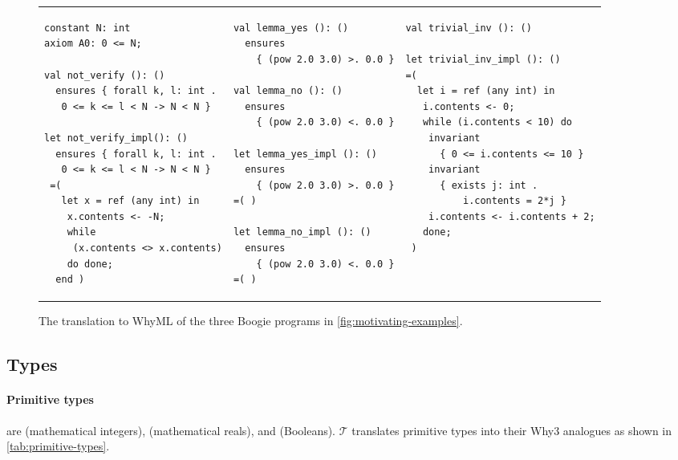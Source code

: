 \documentclass[a4paper,final]{llncs}
\makeatletter
\newif\iflong
\newcommand{\tr}{\mathcal{T}}
\newcommand{\Boogie}{Boogie\xspace}
\newcommand{\WhyML}{WhyML\xspace}
\newcommand{\Why}{Why3\xspace}
\newcommand{\tightParagraph}[1]{\paragraph{#1}}
\newcommand\tightParagraph{\@startsection{paragraph}{4}{\z@}{-5\p@ \@plus -4\p@ \@minus -4\p@}{-0.5em \@plus -0.22em \@minus -0.1em}{\normalfont\normalsize\itshape}}
\newcommand{\feature}[1]{\subsection{#1}}
\makeatother
\begin{document}
\begin{figure}[!tb]
\centering
\scriptsize
\lstset{language=why3,xleftmargin=0pt}
\begin{tabular}{p{} p{} p{}}
{\begin{lstlisting}
constant N: int
axiom A0: 0 <= N;

val not_verify (): ()
  ensures { forall k, l: int .
   0 <= k <= l < N -> N < N }

let not_verify_impl(): ()
  ensures { forall k, l: int .
   0 <= k <= l < N -> N < N }
 =(
   let x = ref (any int) in
    x.contents <- -N;
    while 
     (x.contents <> x.contents)
    do done;
  end )\end{lstlisting}}
&
{\begin{lstlisting}
val lemma_yes (): ()
  ensures
    { (pow 2.0 3.0) >. 0.0 }

val lemma_no (): ()
  ensures
    { (pow 2.0 3.0) <. 0.0 }

let lemma_yes_impl (): ()
  ensures
    { (pow 2.0 3.0) >. 0.0 }
=( )

let lemma_no_impl (): ()
  ensures
    { (pow 2.0 3.0) <. 0.0 }
=( )\end{lstlisting}}
&
{\begin{lstlisting}
val trivial_inv (): ()

let trivial_inv_impl (): ()
=(
  let i = ref (any int) in
   i.contents <- 0;
   while (i.contents < 10) do
    invariant
      { 0 <= i.contents <= 10 }
    invariant
      { exists j: int . 
          i.contents = 2*j }
    i.contents <- i.contents + 2;
   done;
 )\end{lstlisting}}
\end{tabular}
\caption{The translation to \WhyML of the three \Boogie programs in \autoref{fig:motivating-examples}. \iflong(Boilerplate such as general declarations, imports, and frame condition checking are omitted for clarity.)\fi}
\label{fig:translated-motivating-examples}
\end{figure}




\feature{Types} \label{sec:types}
\iflong
\Boogie types include primitive types, instantiated type constructors, and map types.
\fi

\tightParagraph{Primitive types}
are  (mathematical integers),  (mathematical reals), \iflong\else and \fi{} (Bool\-eans)\iflong, and \B{bv$n$} ($n$-bit vectors)\fi.
$\tr$ translates primitive types into their \Why analogues as shown in \autoref{tab:primitive-types}.
\iflong
Since \Why offers primitive types and operations on them through libraries, $\tr$ also generates import statements for the libraries that provide the same operations that are available in \Boogie, such as integer to/from real conversion. \fi
\end{document}
